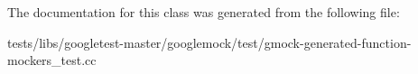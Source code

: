 The documentation for this class was generated from the following file\+:\begin{DoxyCompactItemize}
\item 
tests/libs/googletest-\/master/googlemock/test/gmock-\/generated-\/function-\/mockers\+\_\+test.\+cc\end{DoxyCompactItemize}
